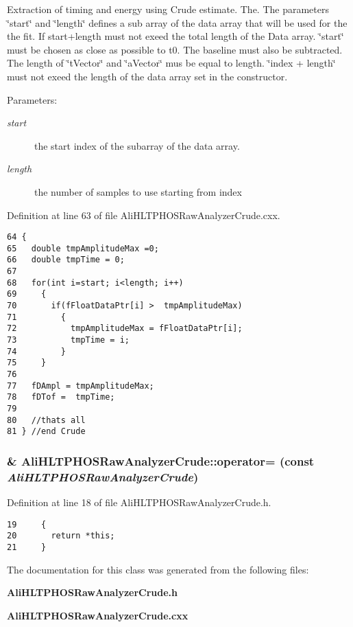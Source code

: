 Extraction of timing and energy using Crude estimate. The. The parameters \char`\"{}start\char`\"{} and \char`\"{}length\char`\"{} defines a sub array of the data array that will be used for the the fit. If start+length must not exeed the total length of the Data array. \char`\"{}start\char`\"{} must be chosen as close as possible to t0. The baseline must also be subtracted. The length of \char`\"{}t\-Vector\char`\"{} and \char`\"{}a\-Vector\char`\"{} mus be equal to length. \char`\"{}index + length\char`\"{} must not exeed the length of the data array set in the constructor. \begin{Desc}
\item[Parameters:]
\begin{description}
\item[{\em start}]the start index of the subarray of the data array. \item[{\em length}]the number of samples to use starting from index \end{description}
\end{Desc}


Definition at line 63 of file Ali\-HLTPHOSRaw\-Analyzer\-Crude.cxx.

\footnotesize\begin{verbatim}64 {
65   double tmpAmplitudeMax =0; 
66   double tmpTime = 0;
67 
68   for(int i=start; i<length; i++)
69     {
70       if(fFloatDataPtr[i] >  tmpAmplitudeMax)
71         {
72           tmpAmplitudeMax = fFloatDataPtr[i];
73           tmpTime = i;               
74         }
75     }
76         
77   fDAmpl = tmpAmplitudeMax;
78   fDTof =  tmpTime;
79  
80   //thats all 
81 } //end Crude
\end{verbatim}\normalsize 


\subsubsection{\& Ali\-HLTPHOSRaw\-Analyzer\-Crude::operator= (const  {\em Ali\-HLTPHOSRaw\-Analyzer\-Crude})\hspace{0.3cm}{\tt  [inline]}}\label{classAliHLTPHOSRawAnalyzerCrude_a2}




Definition at line 18 of file Ali\-HLTPHOSRaw\-Analyzer\-Crude.h.

\footnotesize\begin{verbatim}19     {
20       return *this; 
21     }
\end{verbatim}\normalsize 




The documentation for this class was generated from the following files:\begin{CompactItemize}
\item 
{\bf Ali\-HLTPHOSRaw\-Analyzer\-Crude.h}\item 
{\bf Ali\-HLTPHOSRaw\-Analyzer\-Crude.cxx}\end{CompactItemize}
